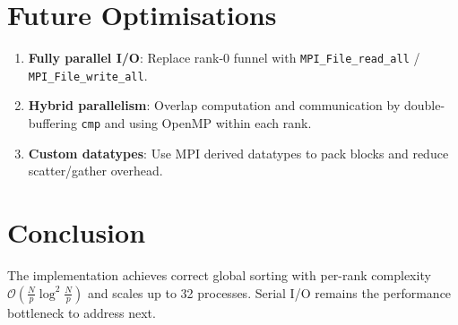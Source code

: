 \documentclass{article}
\begin{document}
\section*{Future Optimisations}
\begin{enumerate}
    \item \textbf{Fully parallel I/O}: Replace rank-0 funnel with \texttt{MPI\_File\_read\_all} / \texttt{MPI\_File\_write\_all}.
    \item \textbf{Hybrid parallelism}: Overlap computation and communication by double-buffering \texttt{cmp} and using OpenMP within each rank.
    \item \textbf{Custom datatypes}: Use MPI derived datatypes to pack blocks and reduce scatter/gather overhead.
\end{enumerate}

\section*{Conclusion}
The implementation achieves correct global sorting with per-rank complexity
$\mathcal{O}(\tfrac{N}{p}\log^2\tfrac{N}{p})$ and scales up to 32 processes.
Serial I/O remains the performance bottleneck to address next.
\end{document}
